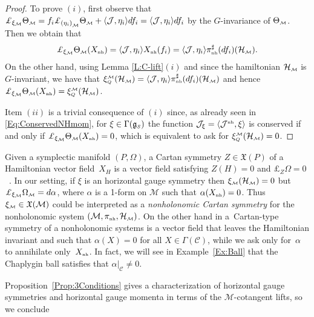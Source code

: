 \documentclass[10pt,a4paper]{amsart}
\numberwithin{equation}{section}
\def\M{\mathcal{M}}
\def\J{\mathcal{J}}
\def\C{\mathcal{C}}
\def\Ham{\mathcal{H}}
\def\g{\mathfrak{g}}
\def\nh{{\mbox{\tiny{nh}}}}
\def\subM{{\mbox{\tiny{$\M$}}}}
\def\subSS{{\mbox{\tiny{$S$}}}}
\begin{document}
\begin{proof}
To prove $(i)$,  f\/irst observe that $\pounds_{\xi_\M}\Theta_\subM  = f_i   \pounds_{{(\eta_i)}_\M} \Theta_\subM + \langle{\mathcal J}, \eta_i \rangle df_i= \langle{\mathcal J}, \eta_i \rangle df_i$ by the $G$-invariance of $\Theta_\subM$. Then we obtain that
\begin{gather*}
\pounds_{\xi_\M}\Theta_\subM (X_\nh) = \langle{\mathcal J}, \eta_i \rangle X_\nh(f_i) = \langle{\mathcal J}, \eta_i \rangle \pi^\sharp_\nh(df_i) (\Ham_\subM).
\end{gather*}
On the other hand, using Lemma \ref{L:C-lift}$(i)$ and since the hamiltonian $\Ham_\subM$ is $G$-invariant, we have that $\xi_{\mbox{\tiny{$Q$}}}^{\subM} (\Ham_\subM) =   \langle \J,\eta_i\rangle    \pi_\nh^\sharp(df_i)  (\Ham_\subM)$ and hence $\pounds_{\xi_\M} \Theta_\subM (X_{\nh})  = \xi_{\mbox{\tiny{$Q$}}}^\subM (\Ham_\subM)$.

Item $(ii)$ is a trivial consequence of $(i)$ since, as already seen in \eqref{Eq:ConservedNHmom}, for $\xi\in\Gamma(\g_\subSS)$ the function ${\mathcal J}_\xi = \langle{\mathcal J}^{\nh}, \xi\rangle$ is conserved if and only if $\pounds_{\xi_\M} \Theta_\subM (X_\nh) = 0$, which is equivalent to ask for $\xi_{\mbox{\tiny{$Q$}}}^\subM (\Ham_\subM)=0$.
\end{proof}

\begin{Remark}\label{R:Cartan}
Given a symplectic manifold $(P, \Omega)$, a Cartan symmetry $Z\in \mathfrak{X}(P)$ of a Hamiltonian vector f\/ield~$X_H$ is a vector f\/ield satisfying $Z(H)=0$ and $\pounds_{Z}\Omega=0$~\cite{Book:Crampin}.  In our setting, if $\xi$ is an horizontal gauge symmetry then $\xi_\subM(\Ham_\subM) = 0$ but $\pounds_{\xi_\subM} \Omega_\subM = d\alpha$, where $\alpha$ is a 1-form on $\M$ such that $\alpha(X_\nh) = 0$. Thus $\xi_\subM\in\mathfrak{X}(\M)$ could be interpreted as a {\it nonholonomic Cartan symmetry} for the nonholonomic system $(\M, \pi_\nh, \Ham_\subM)$.
On the other hand in \cite[Theorem~1]{Crampin-Mestdag} a~Cartan-type symmetry of a nonholonomic
systems is a vector f\/ield that
leaves the Hamiltonian invariant and such that $\alpha(X)=0$ for all $X\in \Gamma(\C)$, while we
ask only for~$\alpha$ to annihilate only~$X_\nh$. In fact, we will see in Example~\ref{Ex:Ball} that the Chaplygin ball satisf\/ies that $\alpha |_\C \neq 0$.
\end{Remark}

Proposition~\ref{Prop:3Conditions} gives a characterization of horizontal gauge symmetries and horizontal gauge momenta in terms of the $\M$-cotangent lifts, so we conclude
\end{document}
